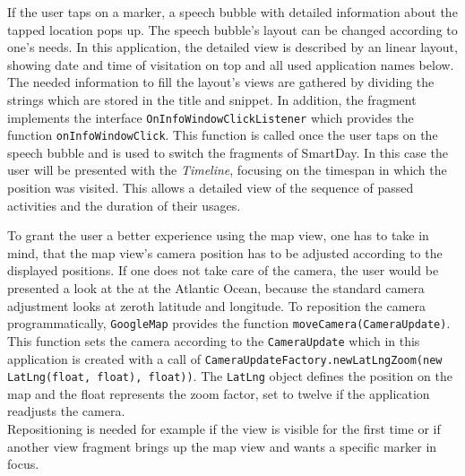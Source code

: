 If  the user taps on a marker, a speech bubble with detailed information about the tapped location pops up. The speech bubble's layout can be changed according to one's needs. In this application, the detailed view is described by an linear layout, showing date and time of visitation on top and all used application names below. The needed information to fill the layout's views are gathered by dividing the strings which are stored in the title and snippet. In addition, the fragment implements the interface \lstinline$OnInfoWindowClickListener$ which provides the function \lstinline$onInfoWindowClick$. This function is called once the user taps on the speech bubble and is used to switch the fragments of SmartDay. In this case the user will be presented with the \emph{Timeline}, focusing on the timespan in which the position was visited. This allows a detailed view of the sequence of passed activities and the duration of their usages.

To  grant the user a better experience using the map view, one has to take in mind, that the map view's camera position has to be adjusted according to the displayed positions. If one does not take care of the camera, the user would be presented a look at the at the Atlantic Ocean, because the standard camera adjustment looks at zeroth latitude and longitude. To reposition the camera programmatically, \lstinline$GoogleMap$ provides the function \lstinline$moveCamera(CameraUpdate)$. This function sets the camera according to the \lstinline$CameraUpdate$ which in this application is created with a call of \lstinline$CameraUpdateFactory.newLatLngZoom(new LatLng(float, float), float))$. The \lstinline$LatLng$ object defines the position on the map and the float represents the zoom factor, set to twelve if the application readjusts the camera.\\
Repositioning is needed for example if the view is visible for the first time or if another view fragment brings up the map view and wants a specific marker in focus.

